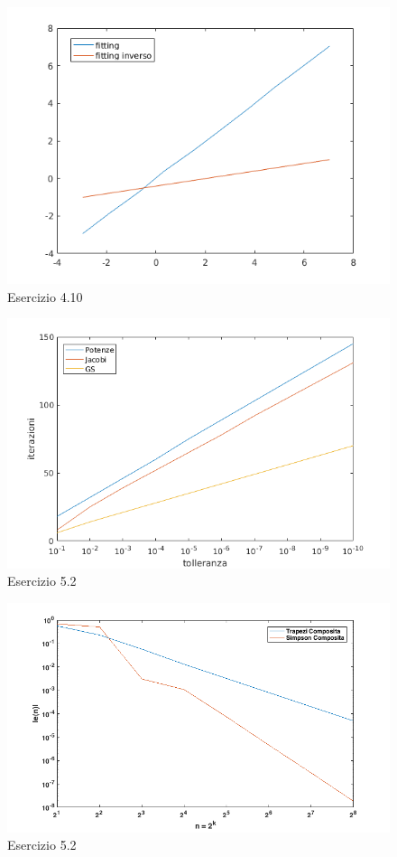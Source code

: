 \begin{figure}[h]
\caption{Esercizio 4.10}
\label{fitting}
\includegraphics[width=\textwidth]{plot/fittinginv}
\end{figure}
\begin{figure}[h]
\caption{Esercizio 5.2}
\label{PR_comparison}
\includegraphics[width=\textwidth]{plot/comparison}
\end{figure}
\begin{figure}[h]
\caption{Esercizio 5.2}
\label{QuadrErr}
\includegraphics[width=\textwidth]{plot/error}
\end{figure}

